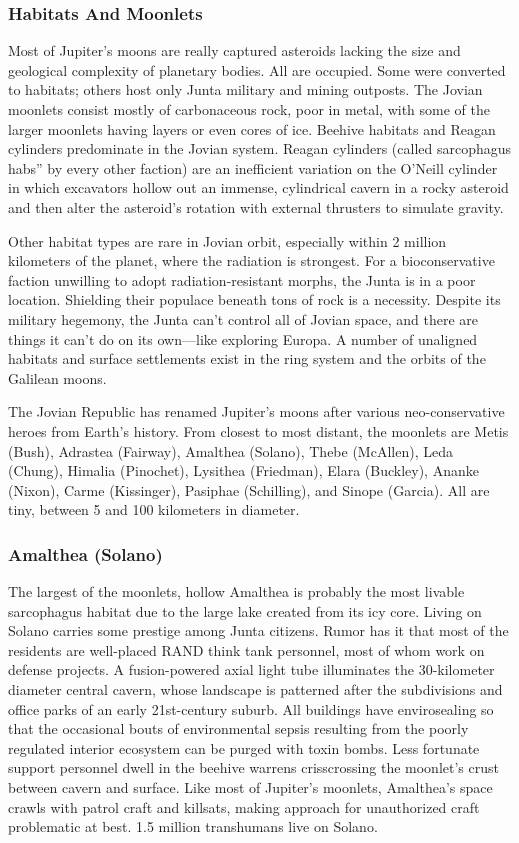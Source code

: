 \subsubsection{Habitats And Moonlets}

Most of Jupiter's moons are really captured asteroids
lacking the size and geological complexity of
planetary bodies. All are occupied. Some were converted
to habitats; others host only Junta military and
mining outposts. The Jovian moonlets consist mostly 
of carbonaceous rock, poor in metal, with some of 
the larger moonlets having layers or even cores of ice. 
Beehive habitats and Reagan cylinders predominate in 
the Jovian system. Reagan cylinders (called sarcophagus
habs'' by every other faction) are an inefficient
variation on the O'Neill cylinder in which excavators 
hollow out an immense, cylindrical cavern in a rocky 
asteroid and then alter the asteroid's rotation with 
external thrusters to simulate gravity.

Other habitat types are rare in Jovian orbit, especially
within 2 million kilometers of the planet, where
the radiation is strongest. For a bioconservative faction
unwilling to adopt radiation-resistant morphs, the
Junta is in a poor location. Shielding their populace 
beneath tons of rock is a necessity. Despite its military 
hegemony, the Junta can't control all of Jovian space, 
and there are things it can't do on its own—like exploring
Europa. A number of unaligned habitats and
surface settlements exist in the ring system and the 
orbits of the Galilean moons.

The Jovian Republic has renamed Jupiter's moons 
after various neo-conservative heroes from Earth's 
history. From closest to most distant, the moonlets are 
Metis (Bush), Adrastea (Fairway), Amalthea (Solano), 
Thebe (McAllen), Leda (Chung), Himalia (Pinochet), 
Lysithea (Friedman), Elara (Buckley), Ananke (Nixon), 
Carme (Kissinger), Pasiphae (Schilling), and Sinope 
(Garcia). All are tiny, between 5 and 100 kilometers 
in diameter.

\subsubsection{Amalthea (Solano)}

The largest of the moonlets, hollow Amalthea is probably
the most livable sarcophagus habitat due to the
large lake created from its icy core. Living on Solano 
carries some prestige among Junta citizens. Rumor has 
it that most of the residents are well-placed RAND 
think tank personnel, most of whom work on defense 
projects. A fusion-powered axial light tube illuminates
the 30-kilometer diameter central cavern, whose
landscape is patterned after the subdivisions and office 
parks of an early 21st-century suburb. All buildings 
have envirosealing so that the occasional bouts of environmental
sepsis resulting from the poorly regulated
interior ecosystem can be purged with toxin bombs. 
Less fortunate support personnel dwell in the beehive 
warrens crisscrossing the moonlet's crust between 
cavern and surface. Like most of Jupiter's moonlets, 
Amalthea's space crawls with patrol craft and killsats, 
making approach for unauthorized craft problematic 
at best. 1.5 million transhumans live on Solano.

